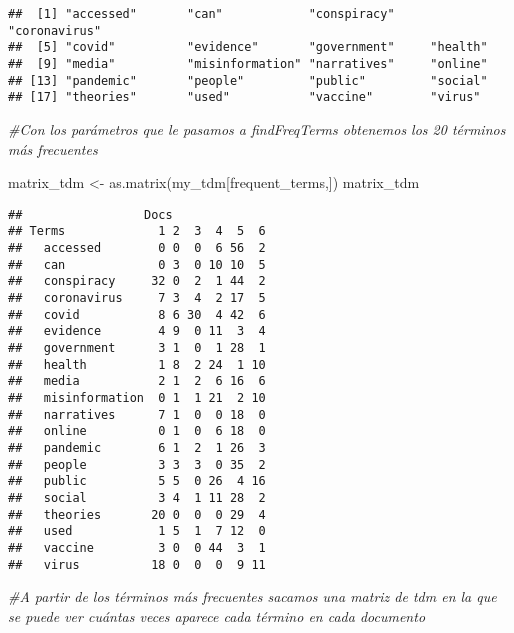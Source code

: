 \documentclass[
]{book}
\newenvironment{Shaded}{\begin{snugshade}}{\end{snugshade}}
\newcommand{\CommentTok}[1]{\textcolor[rgb]{0.56,0.35,0.01}{\textit{#1}}}
\newcommand{\FunctionTok}[1]{\textcolor[rgb]{0.00,0.00,0.00}{#1}}
\newcommand{\NormalTok}[1]{#1}
\newcommand{\OtherTok}[1]{\textcolor[rgb]{0.56,0.35,0.01}{#1}}
\begin{document}
\begin{verbatim}
##  [1] "accessed"       "can"            "conspiracy"     "coronavirus"   
##  [5] "covid"          "evidence"       "government"     "health"        
##  [9] "media"          "misinformation" "narratives"     "online"        
## [13] "pandemic"       "people"         "public"         "social"        
## [17] "theories"       "used"           "vaccine"        "virus"
\end{verbatim}

\begin{Shaded}
\begin{Highlighting}[]
\CommentTok{\#Con los parámetros que le pasamos a findFreqTerms obtenemos los 20 términos más frecuentes }
\end{Highlighting}
\end{Shaded}

\begin{Shaded}
\begin{Highlighting}[]
\NormalTok{matrix\_tdm }\OtherTok{\textless{}{-}} \FunctionTok{as.matrix}\NormalTok{(my\_tdm[frequent\_terms,])}
\NormalTok{matrix\_tdm}
\end{Highlighting}
\end{Shaded}

\begin{verbatim}
##                 Docs
## Terms             1 2  3  4  5  6
##   accessed        0 0  0  6 56  2
##   can             0 3  0 10 10  5
##   conspiracy     32 0  2  1 44  2
##   coronavirus     7 3  4  2 17  5
##   covid           8 6 30  4 42  6
##   evidence        4 9  0 11  3  4
##   government      3 1  0  1 28  1
##   health          1 8  2 24  1 10
##   media           2 1  2  6 16  6
##   misinformation  0 1  1 21  2 10
##   narratives      7 1  0  0 18  0
##   online          0 1  0  6 18  0
##   pandemic        6 1  2  1 26  3
##   people          3 3  3  0 35  2
##   public          5 5  0 26  4 16
##   social          3 4  1 11 28  2
##   theories       20 0  0  0 29  4
##   used            1 5  1  7 12  0
##   vaccine         3 0  0 44  3  1
##   virus          18 0  0  0  9 11
\end{verbatim}

\begin{Shaded}
\begin{Highlighting}[]
\CommentTok{\#A partir de los términos más frecuentes sacamos una matriz de tdm en la que se puede ver cuántas veces aparece cada término en cada documento}
\end{Highlighting}
\end{Shaded}
\end{document}

